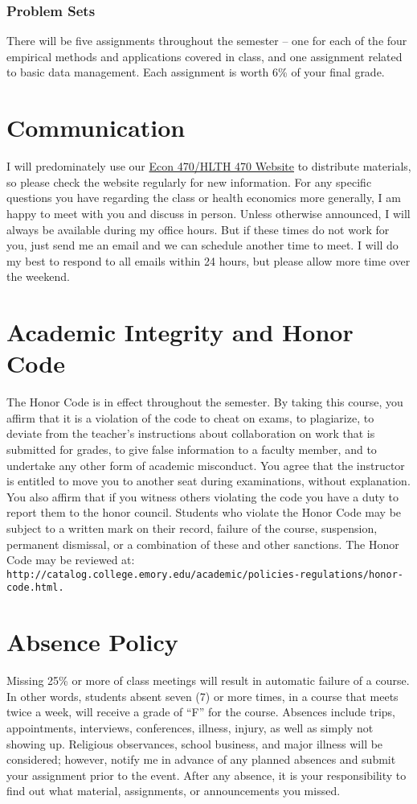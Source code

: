 \documentclass{article}
\begin{document}
\subsubsection*{Problem Sets}
There will be five assignments throughout the semester -- one for each of the four empirical methods and applications covered in class, and one assignment related to basic data management. Each assignment is worth 6\% of your final grade.

\section*{Communication}
I will predominately use our \href{https://imccart.github.io/Econ-372/}{Econ 470/HLTH 470 Website} to distribute materials, so please check the website regularly for new information. For any specific questions you have regarding the class or health economics more generally, I am happy to meet with you and discuss in person. Unless otherwise announced, I will always be available during my office hours. But if these times do not work for you, just send me an email and we can schedule another time to meet. I will do my best to respond to all emails within 24 hours, but please allow more time over the weekend.

\section*{Academic Integrity and Honor Code}
The Honor Code is in effect throughout the semester. By taking this course, you affirm that it is a violation of the code to cheat on exams, to plagiarize, to deviate from the teacher's instructions about collaboration on work that is submitted for grades, to give false information to a faculty member, and to undertake any other form of academic misconduct. You agree that the instructor is entitled to move you to another seat during examinations, without explanation. You also affirm that if you witness others violating the code you have a duty to report them to the honor council. Students who violate the Honor Code may be subject to a written mark on their record, failure of the course, suspension, permanent dismissal, or a combination of these and other sanctions. The Honor Code may be reviewed at: \texttt{http://catalog.college.emory.edu/academic/policies-regulations/honor-code.html.}

\section*{Absence Policy}
Missing 25\% or more of class meetings will result in automatic failure of a course. In other words, students absent seven (7) or more times, in a course that meets twice a week, will receive a grade of ``F'' for the course.  Absences include trips, appointments, interviews, conferences, illness, injury, as well as simply not showing up. Religious observances, school business, and major illness will be considered; however, notify me in advance of any planned absences and submit your assignment prior to the event. After any absence, it is your responsibility to find out what material, assignments, or announcements you missed.


\pagebreak


\end{document}
